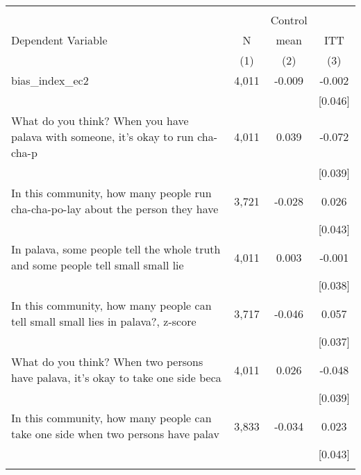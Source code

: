 \begin{tabular}{lccc}
\hline \noalign{\smallskip} &  &  & \\
 &  & Control & \\
Dependent Variable & N & mean & ITT\\
 & (1) & (2) & (3)\\
\noalign{\smallskip}\hline \noalign{\smallskip}bias_index_ec2 & 4,011 & -0.009 & -0.002\\
 &  &  & [0.046]\\
What do you think? When you have palava with someone, it's okay to run cha-cha-p & 4,011 & 0.039 & -0.072\\
 &  &  & [0.039]\\
In this community, how many people run cha-cha-po-lay about the person they have & 3,721 & -0.028 & 0.026\\
 &  &  & [0.043]\\
In palava, some people tell the whole truth and some people tell small small lie & 4,011 & 0.003 & -0.001\\
 &  &  & [0.038]\\
In this community, how many people can tell small small lies in palava?, z-score & 3,717 & -0.046 & 0.057\\
 &  &  & [0.037]\\
What do you think? When two persons have palava, it's okay to take one side beca & 4,011 & 0.026 & -0.048\\
 &  &  & [0.039]\\
In this community, how many people can take one side when two persons have palav & 3,833 & -0.034 & 0.023\\
 &  &  & [0.043]\\
\noalign{\smallskip}\hline\end{tabular}
